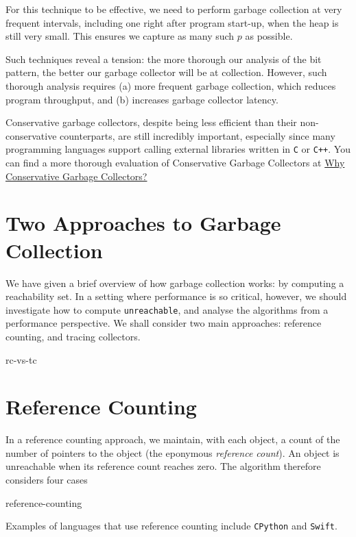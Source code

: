 For this technique to be effective, we need to perform garbage collection at very frequent intervals, including one right after program start-up, when the heap is still very small. This ensures we capture as many such $p$ as possible. 

Such techniques reveal a tension: the more thorough our analysis of the bit pattern, the better our garbage collector will be at collection. However, such thorough analysis requires (a) more frequent garbage collection, which reduces program throughput, and (b) increases garbage collector latency.

Conservative garbage collectors, despite being less efficient than their non-conservative counterparts, are still incredibly important, especially since many programming languages support calling external libraries written in \texttt{C} or \texttt{C++}. You can find a more thorough evaluation of Conservative Garbage Collectors at \href{https://www.hboehm.info/gc/conservative.html}{Why Conservative Garbage Collectors?}

\section{Two Approaches to Garbage Collection}
We have given a brief overview of how garbage collection works: by computing a reachability set. In a setting where performance is so critical, however, we should investigate how to compute \texttt{unreachable}, and analyse the algorithms from a performance perspective. We shall consider two main approaches: reference counting, and tracing collectors.

\begin{center}
    {rc-vs-tc}
\end{center}

\section{Reference Counting}
In a reference counting approach, we maintain, with each object, a count of the number of pointers to the object (the eponymous \textit{reference count}). An object is unreachable when its reference count reaches zero. The algorithm therefore considers four cases

\begin{center}
    {reference-counting}
\end{center}

Examples of languages that use reference counting include \texttt{CPython} and \texttt{Swift}.

